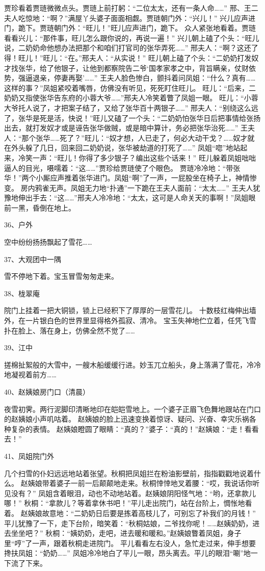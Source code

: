 贾珍看着贾琏微微点头。贾琏上前打躬：“二位太太，还有一条人命……”
邢、王二夫人吃惊地：“啊？”满屋丫头婆子面面相觑。贾琏朝门外：“兴儿！”
兴儿应声进门，跪下。贾琏朝门外：“旺儿！”旺儿应声进门，跪下。
众人紧张地看着。贾琏看看兴儿：“那件事，旺儿怎么跟你说的，再说一遍！”
兴儿朝上磕了个头：“旺儿说，二奶奶命他想办法把那个和咱们打官司的张华弄死……”
邢夫人：“啊？这还了得！旺儿！”旺儿：“在。”邢夫人：“从实说！”
旺儿朝上磕了个头：“二奶奶打发奴才找张华，给了他银子，让他到都察院告二爷‘国孝家孝之中，背旨瞒亲，仗财依势，强逼退亲，停妻再娶’……”
王夫人脸色惨白，颤抖着问凤姐：“什么？真有……这样的事？”凤姐紧咬着嘴唇，仿佛没有听见，死死盯住旺儿。
旺儿：“后来，二奶奶又指使张华告东府的小蓉大爷……”邢夫人冷笑着瞥了凤姐一眼。
旺儿：“小蓉大爷托人说了，才把案子结了，又给了张华百十两银子……”
邢夫人：“别绕这么远了，张华是死是活，快说！”旺儿又磕了一个头：“二奶奶怕张华日后把事情给张扬出去，就打发奴才或是诬告张华做贼，或是暗中算计，务必把张华治死……”
王夫人：“那个张华……死了？”旺儿：“奴才想，人已走了，何必大动干戈？……奴才就在外头躲了几日，回来回二奶奶说，张华被劫道的打死了……”
凤姐“唿”地站起来，冷笑一声：“旺儿！你得了多少银子？编出这些个话来！”
旺儿躲着凤姐咄咄逼人的目光，嗫嚅着：“这……”贾珍给贾琏使了个眼色。
贾琏冷冷地：“带张华！”两个小厮应声推着张华进门。凤姐“啊”了一声，一屁股坐在椅子上，神情惨变。
房内鸦雀无声。凤姐无力地“扑通”一下跪在王夫人面前：“太太……”
王夫人犹豫地伸出手去：“这……”邢夫人冷冷地：“太太，这可是人命关天的事啊！”凤姐眼前一黑，昏倒在地上。

36、户外\par
空中纷纷扬扬飘起了雪花……

37、大观团中一隅\par
雪不停地下着。宝玉冒雪匆匆走来。

38、栊翠庵\par
院门上挂着一把大铜锁，锁上已经积下了厚厚的一层雪花儿。
十数枝红梅伸出墙外，在一片银白色的世界里显得格外孤寂、清冷。
宝玉失神地伫立着，任凭飞雪扑在脸上、落在身上，仿佛全然不觉了……

39、江中\par
搓棉扯絮般的大雪中，一艘木船缓缓行进。妙玉兀立船头，身上落满了雪花，冷冷地凝视着前方……

40、赵姨娘房门口（清晨）\par
夜雪初霁。两行泥脚印清晰地印在皑皑雪地上。一个婆子正眉飞色舞地跟站在门口的赵姨娘小声叽咕着。
赵姨娘的脸上迅速变换着惊讶、疑问、兴奋、幸灾乐祸各种复杂的表情。
赵姨娘瞪圆了眼睛：“真的？”婆子：“真的！”赵姨娘：“走！看看去！”

41、凤姐院门外\par
几个扫雪的仆妇远远地站着张望。秋桐把凤姐拦在粉油影壁前，指指戳戳地说着什么。
赵姨娘带着婆子一前一后颠颠地走来。秋桐悻悻地叉着腰：“哎，我说话你听见没有？”
凤姐含着眼泪，动也不动地站着。赵姨娘阴阳怪气地：“哟，还拿款儿哪！”
秋桐：“拿款儿？等着拿休书吧！”平儿走出院门，站在台阶上，惆怅地看着。
赵姨娘故意地：“二奶奶日后要是拣着高枝儿了，可别忘了补我们的月钱！”
平儿犹豫了一下，走下台阶，暗笑着：“秋桐姑娘，二爷找你呢！……赵姨奶奶，进去坐坐吧？”
秋桐：“姨奶奶，走吧，进去暖和暖和。”赵姨娘瞥着凤姐，身子里“哼”了一声，跟着秋桐走进院门。
平儿看看左右没人，急忙走过来，伸手想要搀扶凤姐：“奶奶……”
凤姐冷冷地白了平儿一眼，昂头离去。平儿的眼泪“唰”地一下流了下来。

